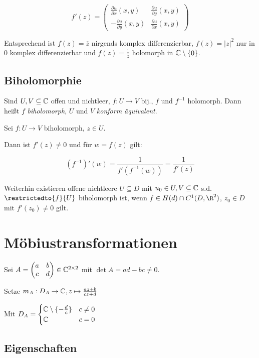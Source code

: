 $$f'(z) = \begin{pmatrix}
	\frac{\partial u}{\partial x}(x,y) & \frac{\partial u}{\partial y}(x,y) \\
	-\frac{\partial u}{\partial y}(x,y) & \frac{\partial u}{\partial x}(x,y)
\end{pmatrix}$$

Entsprechend ist $f(z)=\overline z$ nirgends komplex differenzierbar, $f(z)=|z|^2$ nur in $0$ komplex differenzierbar und $f(z) = \frac{1}{z}$ holomorph in $\mathbb{C} \setminus \{0\}$.

\subsection*{Biholomorphie}

Sind $U, V \subseteq \mathbb{C}$ offen und nichtleer, $f : U \to V$ bij., $f$ und $f^{-1}$ holomorph. Dann heißt $f$ \emph{biholomorph}, $U$ und $V$ \emph{konform äquivalent}.

\vfill\null
\columnbreak

Sei $f : U \to V$ biholomorph, $z \in U$.

Dann ist $f'(z) \neq 0$ und für $w = f(z)$ gilt:

\vspace*{-2mm}
$$(f^{-1})'(w) = \frac{1}{f'(f^{-1}(w))} = \frac{1}{f'(z)}$$

Weiterhin existieren offene nichtleere $U \subseteq D$ mit $u_0 \in U, V \subseteq \mathbb{C}$ s.d. $\restrictedto{f}{U}$ biholomorph ist, wenn $f \in H(d) \cap C^1(D,\R^2)$, $z_0 \in D$ mit $f'(z_0) \neq 0$ gilt.

\section*{Möbiustransformationen}

Sei $A = \begin{pmatrix} a & b \\ c & d\end{pmatrix} \in \mathbb{C}^{2 \times 2}$ mit $\det A = ad - bc \neq 0$.

Setze $m_A : D_A \to \mathbb{C}, z \mapsto \frac{az+b}{cz+d}$

Mit $D_A = \begin{cases} \mathbb{C} \setminus \{-\frac{d}{c}\} & c \neq 0 \\ \mathbb{C} & c = 0\end{cases}$

\subsection*{Eigenschaften}

